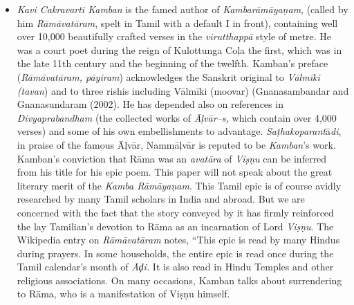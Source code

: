 \begin{itemize}
\item \textit{Kavi Cakravarti Kamban} is the famed author of \textit{Kambarāmāyaṇam}, (called by him \textit{Rāmāvatāram}, spelt in Tamil with a default I in front), containing well over 10,000 beautifully crafted verses in the \textit{virutthappā} style of metre. He was a court poet during the reign of Kulottunga Coļa the first, which was in the late 11th century and the beginning of the twelfth. Kamban’s preface (\textit{Rāmāvatāram, pāyiram}) acknowledges the Sanskrit original to \textit{Vālmīki (tavan}) and to three rishis including Vālmīki (moovar) (Gnanasambandar and Gnanasundaram (2002). He has depended also on references in \textit{Divyaprabandham} (the collected works of \textit{Āļvār–s,} which contain over 4,000 verses) and some of his own embellishments to advantage. \textit{Saṭhakoparant}ā\textit{di}, in praise of the famous Āļvār, Nammāļvār is reputed to be \textit{Kamban}’s work. Kamban’s conviction that Rāma was an \textit{avatāra} of \textit{Viṣṇu} can be inferred from his title for his epic poem. This paper will not speak about the great literary merit of the \textit{Kamba Rāmāyaņam}. This Tamil epic is of course avidly researched by many Tamil scholars in India and abroad. But we are concerned with the fact that the story conveyed by it has firmly reinforced the lay Tamilian’s devotion to Rāma as an incarnation of Lord \textit{Viṣṇu}. The Wikipedia entry on \textit{Rāmāvatāram} notes, “This epic is read by many Hindus during prayers. In some households, the entire epic is read once during the Tamil calendar's month of \textit{Āḑi.} It is also read in Hindu Temples and other religious associations. On many occasions, Kamban talks about surrendering to Rāma, who is a manifestation of Viṣṇu himself.


\end{itemize}
